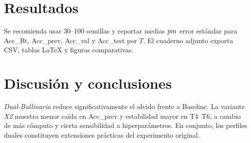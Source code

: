 \documentclass[11pt]{article}
\begin{document}
\section{Resultados}
Se recomienda usar 30--100 semillas y reportar medias $\\pm$ error estándar para Acc\_Bt, Acc\_prev, Acc\_val y Acc\_test por $T$. El cuaderno adjunto exporta CSV, tablas LaTeX y figuras comparativas.

\section{Discusión y conclusiones}
\emph{Dual-Bullinaria} reduce significativamente el olvido frente a Baseline. La variante \emph{X2} muestra menor caída en Acc\_prev y estabilidad mayor en T4--T6, a cambio de más cómputo y cierta sensibilidad a hiperparámetros. En conjunto, los perfiles duales constituyen extensiones prácticas del experimento original.
\end{document}
